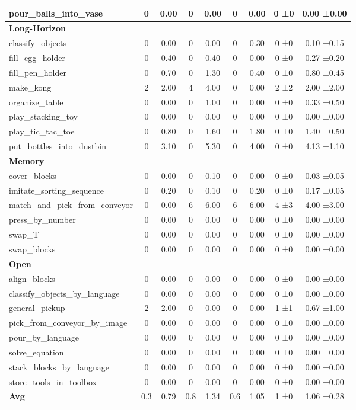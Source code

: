 \begin{table}[H]
{\begin{tabular}{l|c|c|c|c|c|c|c|c}
pour\_balls\_into\_vase & 0 & 0.00 & 0 & 0.00 & 0 & 0.00 & 0 ±0 & 0.00 ±0.00 \\
\hline
\multicolumn{9}{l}{\textbf{Long-Horizon}} \\
classify\_objects & 0 & 0.00 & 0 & 0.00 & 0 & 0.30 & 0 ±0 & 0.10 ±0.15 \\
fill\_egg\_holder & 0 & 0.40 & 0 & 0.40 & 0 & 0.00 & 0 ±0 & 0.27 ±0.20 \\
fill\_pen\_holder & 0 & 0.70 & 0 & 1.30 & 0 & 0.40 & 0 ±0 & 0.80 ±0.45 \\
make\_kong & 2 & 2.00 & 4 & 4.00 & 0 & 0.00 & 2 ±2 & 2.00 ±2.00 \\
organize\_table & 0 & 0.00 & 0 & 1.00 & 0 & 0.00 & 0 ±0 & 0.33 ±0.50 \\
play\_stacking\_toy & 0 & 0.00 & 0 & 0.00 & 0 & 0.00 & 0 ±0 & 0.00 ±0.00 \\
play\_tic\_tac\_toe & 0 & 0.80 & 0 & 1.60 & 0 & 1.80 & 0 ±0 & 1.40 ±0.50 \\
put\_bottles\_into\_dustbin & 0 & 3.10 & 0 & 5.30 & 0 & 4.00 & 0 ±0 & 4.13 ±1.10 \\
\hline
\multicolumn{9}{l}{\textbf{Memory}} \\
cover\_blocks & 0 & 0.00 & 0 & 0.10 & 0 & 0.00 & 0 ±0 & 0.03 ±0.05 \\
imitate\_sorting\_sequence & 0 & 0.20 & 0 & 0.10 & 0 & 0.20 & 0 ±0 & 0.17 ±0.05 \\
match\_and\_pick\_from\_conveyor & 0 & 0.00 & 6 & 6.00 & 6 & 6.00 & 4 ±3 & 4.00 ±3.00 \\
press\_by\_number & 0 & 0.00 & 0 & 0.00 & 0 & 0.00 & 0 ±0 & 0.00 ±0.00 \\
swap\_T & 0 & 0.00 & 0 & 0.00 & 0 & 0.00 & 0 ±0 & 0.00 ±0.00 \\
swap\_blocks & 0 & 0.00 & 0 & 0.00 & 0 & 0.00 & 0 ±0 & 0.00 ±0.00 \\
\hline
\multicolumn{9}{l}{\textbf{Open}} \\
align\_blocks & 0 & 0.00 & 0 & 0.00 & 0 & 0.00 & 0 ±0 & 0.00 ±0.00 \\
classify\_objects\_by\_language & 0 & 0.00 & 0 & 0.00 & 0 & 0.00 & 0 ±0 & 0.00 ±0.00 \\
general\_pickup & 2 & 2.00 & 0 & 0.00 & 0 & 0.00 & 1 ±1 & 0.67 ±1.00 \\
pick\_from\_conveyor\_by\_image & 0 & 0.00 & 0 & 0.00 & 0 & 0.00 & 0 ±0 & 0.00 ±0.00 \\
pour\_by\_language & 0 & 0.00 & 0 & 0.00 & 0 & 0.00 & 0 ±0 & 0.00 ±0.00 \\
solve\_equation & 0 & 0.00 & 0 & 0.00 & 0 & 0.00 & 0 ±0 & 0.00 ±0.00 \\
stack\_blocks\_by\_language & 0 & 0.00 & 0 & 0.00 & 0 & 0.00 & 0 ±0 & 0.00 ±0.00 \\
store\_tools\_in\_toolbox & 0 & 0.00 & 0 & 0.00 & 0 & 0.00 & 0 ±0 & 0.00 ±0.00 \\
\hline
\textbf{Avg} & 0.3 & 0.79 & 0.8 & 1.34 & 0.6 & 1.05 & 1 ±0 & 1.06 ±0.28 \\
\hline
\end{tabular}
}
\end{table}
